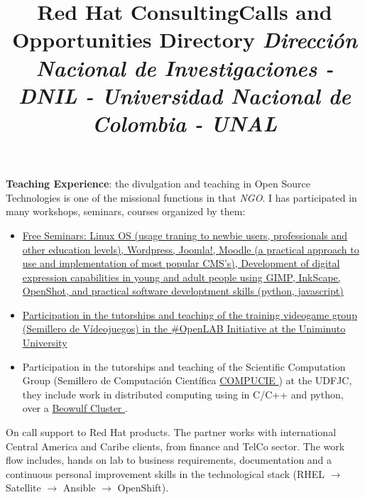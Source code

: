 \documentclass[overlapped,line,final]{../../templates/MichaelDeCorteCV/lib/res}
\begin{document}
\begin{resume}
\begin{position}
	\textbf{Teaching Experience}: the divulgation and teaching in Open Source Technologies is one of the missional functions in that \textit{NGO}. I has participated in many workshops, seminars, courses organized by them:
	\begin{itemize}
		\item \href{https://opensai.org/tags/talleres}{Free Seminars: Linux OS (usage traning to newbie users, professionals and other education levels), Wordpress, Joomla!, Moodle (a practical approach to use and implementation of most popular CMS's), Development of digital expression capabilities in young and adult people using GIMP, InkScape, OpenShot, and practical software developtment skills (python, javascript) {}}
		\item \href{https://opensai.org/tags/videojuegos}{Participation in the tutorships and teaching of the training videogame group (Semillero de Vídeojuegos) in the \#OpenLAB Initiative at the Uniminuto University }
		\item Participation in the tutorships and teaching of the Scientific Computation Group (Semillero de Computación Científica  \href{http://chronos.udistrital.edu.co:8095/siciud/web/Consultas.x?accion=5&idSemillero=2382}{COMPUCIE }) at the UDFJC, they include work in distributed computing using in C/C++ and python, over a \href{https://en.wikipedia.org/wiki/Beowulf_cluster}{Beowulf Cluster }. 
	\end{itemize}
\end{position}


\title{\bf Red Hat Consulting}
\begin{position}
	On call support to Red Hat products. The partner works with international Central America and Caribe clients, from finance and TelCo sector. The work flow includes, hands on lab to business requirements, documentation and a continuous personal improvement skills in the technological stack (RHEL $\rightarrow$ Satellite $\rightarrow$ Ansible $\rightarrow$ OpenShift).
\end{position}

\title{\bf Calls and Opportunities Directory
		\newline \em Dirección Nacional de Investigaciones - DNIL - Universidad Nacional de Colombia - UNAL
}


\end{resume}
\end{document}
